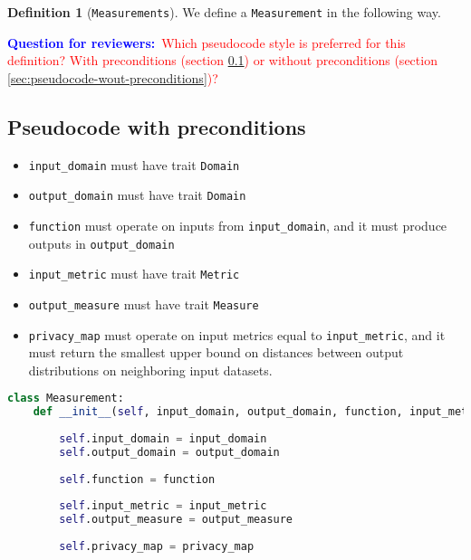 \documentclass[11pt,a4paper]{article}
\theoremstyle{definition}
\newtheorem{definition}[theorem]{Definition}
\newcommand{\questionc}[1]{\textcolor{red}{\textbf{Question:} #1}}
\newcommand{\questionr}[1]{\textcolor{blue}{\textbf{Question for reviewers:}}\textcolor{red}{~#1}}
\newcommand{\todonei}{{\textcolor{red}{TODO (future -- not enough info yet): }}}
\begin{document}
\begin{definition}[\texttt{Measurements}]

    We define a \texttt{Measurement} in the following way.
    

    
    \questionr{Which pseudocode style is preferred for this definition? With preconditions (section \ref{sec:pseudocode-w-preconditions}) or without preconditions (section \ref{sec:pseudocode-wout-preconditions})?}
    
\subsection{Pseudocode with preconditions}
\label{sec:pseudocode-w-preconditions}
\begin{itemize}
    \item \texttt{input\_domain} must have trait \texttt{Domain}
    \item \texttt{output\_domain} must have trait \texttt{Domain}
    \item \texttt{function} must operate on inputs from \texttt{input\_domain}, and it must produce outputs in \texttt{output\_domain}
    \item \texttt{input\_metric} must have trait \texttt{Metric}
    \item \texttt{output\_measure} must have trait \texttt{Measure}
    \item \texttt{privacy\_map} must operate on input metrics equal to \texttt{input\_metric}, and it must return the smallest upper bound on distances between output distributions on neighboring input datasets.
    
\end{itemize}
\begin{lstlisting}[language=Python]
class Measurement:
    def __init__(self, input_domain, output_domain, function, input_metric, output_measure, privacy_relation):
        
        self.input_domain = input_domain
        self.output_domain = output_domain
        
        self.function = function
        
        self.input_metric = input_metric
        self.output_measure = output_measure
        
        self.privacy_map = privacy_map
\end{lstlisting}
    

\end{definition}
\end{document}

